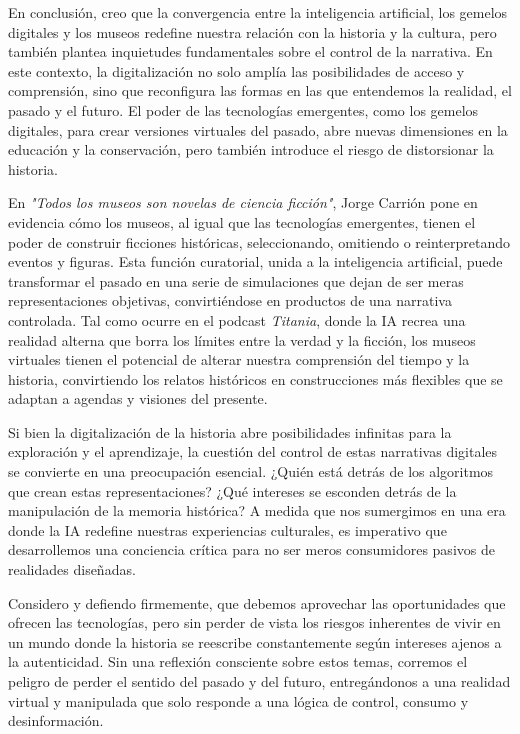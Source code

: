 \documentclass[
  spanish,
  11pt,
  a4paper,
]{scrbook}
\begin{document}
En conclusión, creo que la convergencia entre la inteligencia
artificial, los gemelos digitales y los museos redefine nuestra relación
con la historia y la cultura, pero también plantea inquietudes
fundamentales sobre el control de la narrativa. En este contexto, la
digitalización no solo amplía las posibilidades de acceso y comprensión,
sino que reconfigura las formas en las que entendemos la realidad, el
pasado y el futuro. El poder de las tecnologías emergentes, como los
gemelos digitales, para crear versiones virtuales del pasado, abre
nuevas dimensiones en la educación y la conservación, pero también
introduce el riesgo de distorsionar la historia.

En \emph{"Todos los museos son novelas de ciencia ficción"}, Jorge
Carrión pone en evidencia cómo los museos, al igual que las tecnologías
emergentes, tienen el poder de construir ficciones históricas,
seleccionando, omitiendo o reinterpretando eventos y figuras. Esta
función curatorial, unida a la inteligencia artificial, puede
transformar el pasado en una serie de simulaciones que dejan de ser
meras representaciones objetivas, convirtiéndose en productos de una
narrativa controlada. Tal como ocurre en el podcast \emph{Titania},
donde la IA recrea una realidad alterna que borra los límites entre la
verdad y la ficción, los museos virtuales tienen el potencial de alterar
nuestra comprensión del tiempo y la historia, convirtiendo los relatos
históricos en construcciones más flexibles que se adaptan a agendas y
visiones del presente.

Si bien la digitalización de la historia abre posibilidades infinitas
para la exploración y el aprendizaje, la cuestión del control de estas
narrativas digitales se convierte en una preocupación esencial. ¿Quién
está detrás de los algoritmos que crean estas representaciones? ¿Qué
intereses se esconden detrás de la manipulación de la memoria histórica?
A medida que nos sumergimos en una era donde la IA redefine nuestras
experiencias culturales, es imperativo que desarrollemos una conciencia
crítica para no ser meros consumidores pasivos de realidades diseñadas.

Considero y defiendo firmemente, que debemos aprovechar las
oportunidades que ofrecen las tecnologías, pero sin perder de vista los
riesgos inherentes de vivir en un mundo donde la historia se reescribe
constantemente según intereses ajenos a la autenticidad. Sin una
reflexión consciente sobre estos temas, corremos el peligro de perder el
sentido del pasado y del futuro, entregándonos a una realidad virtual y
manipulada que solo responde a una lógica de control, consumo y
desinformación.
\end{document}
